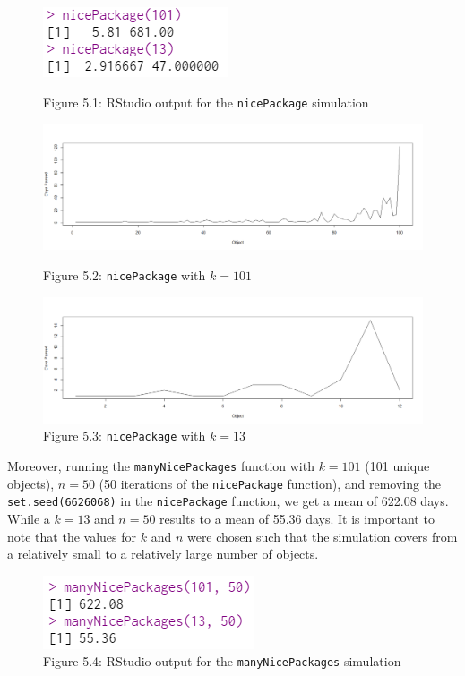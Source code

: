 \documentclass[12pt,letterpaper]{article}
\newcommand{\code}[1]{\colorbox{light-gray}{\texttt{#1}}}
\begin{document}
\begin{enumerate}[label=\Alph*]
\begin{figure}[H]
          \includegraphics[scale=0.8]{nicePackage.png}
          \caption*{\footnotesize Figure 5.1: RStudio output for the \code{nicePackage} simulation}
          \includegraphics*[scale=0.4]{fig5.1.png}
          \caption*{\footnotesize Figure 5.2: \code{nicePackage} with $k=101$}

          \includegraphics*[scale=0.4]{fig5.2.png}
          \caption*{\footnotesize Figure 5.3: \code{nicePackage} with $k=13$}
          
        \end{figure}

        Moreover, running the \code{manyNicePackages} function with $k=101$ (101 unique objects), $n=50$ (50 iterations of the \code{nicePackage} function), and removing the \code{set.seed(6626068)} in the \code{nicePackage} function, we get a mean of 622.08 days. While a $k=13$ and $n=50$ results to a mean of 55.36 days. It is important to note that the values for $k$ and $n$ were chosen such that the simulation covers from a relatively small to a relatively large number of objects.
        \vspace*{0.3cm}
        \begin{figure}[h]
          \centering
          \includegraphics[scale=0.8]{manyNicePackage.png}
          \caption*{\footnotesize Figure 5.4: RStudio output for the \code{manyNicePackages} simulation}
        \end{figure}

    \end{enumerate}
    
    
\end{document}
